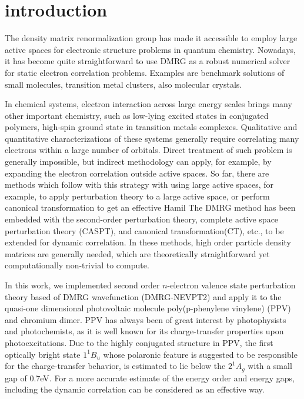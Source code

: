 
\section{introduction}

The density matrix renormalization group \cite{white_density_1992,white_density-matrix_1993} has made it accessible to employ large active spaces 
for electronic structure problems in quantum chemistry. Nowadays, it has become quite straightforward to use DMRG as a robust numerical solver for 
static electron correlation problems. Examples are benchmark solutions of small molecules\cite{chan_highly_2002}, transition metal 
clusters\cite{sharma_low-energy_2014, olivares-amaya_ab-initio_2015}, also molecular crystals\cite{yang_ab_2014}. 

In chemical systems, electron interaction across large energy scales brings many other important chemistry, such as low-lying excited states in 
conjugated polymers, high-spin ground state in transition metals complexes. Qualitative and quantitative characterizations of 
these systems generally require correlating many electrons within a large number of orbitals. Direct treatment of such problem is generally 
impossible, but indirect methodology can apply, for example, by expanding the electron correlation outside active spaces. So far, there are 
methods which follow with this strategy with using large active spaces, for example, to apply perturbation theory to a large active space, or 
perform canonical transformation to get an effective Hamil
The DMRG method has been embedded with the second-order perturbation theory\cite{kurashige_second-order_2011, sharma_communication:_2014}, 
complete active space perturbation theory (CASPT), and canonical transformation(CT)\cite{neuscamman_review_2010}, etc., to be extended for dynamic correlation. In these methods, high order particle density matrices are generally needed, which are theoretically straightforward yet computationally non-trivial to compute.

In this work, we implemented second order $n$-electron valence state perturbation theory based of DMRG wavefunction (DMRG-NEVPT2) and 
apply it to the quasi-one dimensional  photovoltaic molecule poly(p-phenylene vinylene) (PPV) and chromium dimer. PPV has always been 
of great interest by photophysists and photochemists, as it is well known for its charge-transfer properties upon photoexcitations. Due 
to the highly conjugated structure in PPV, the first optically bright state $1^{1}B_{u}$ whose polaronic feature is suggested to be 
responsible for the charge-transfer behavior, is estimated to lie below the $2^{1}A_{g}$ with a small gap of 0.7eV. For a more accurate 
estimate of the energy order and energy gaps, including the dynamic correlation can be considered as an effective way. %


